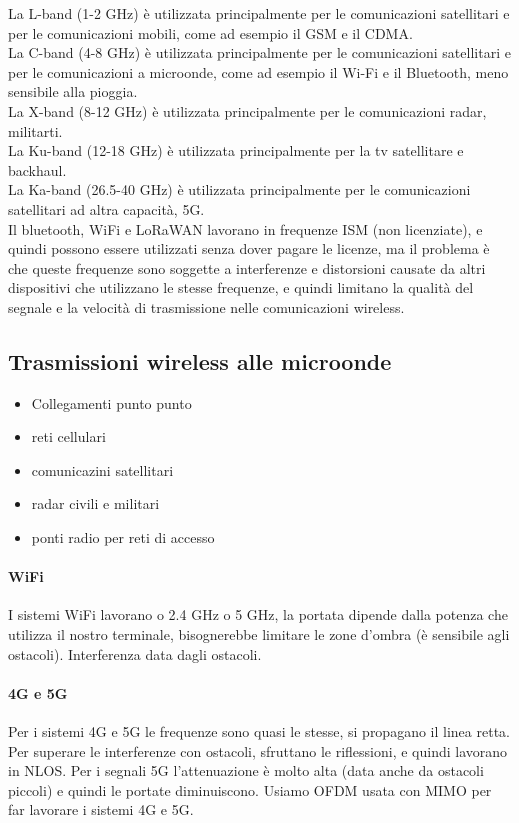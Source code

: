La L-band (1-2 GHz) è utilizzata principalmente per le comunicazioni satellitari e per le comunicazioni mobili, come ad esempio il GSM e il CDMA.\\
La C-band (4-8 GHz) è utilizzata principalmente per le comunicazioni satellitari e per le comunicazioni a microonde, come ad esempio il Wi-Fi e il Bluetooth, meno sensibile alla pioggia.\\
La X-band (8-12 GHz) è utilizzata principalmente per le comunicazioni radar, militarti.\\   
La Ku-band (12-18 GHz) è utilizzata principalmente per la tv satellitare e backhaul.\\
La Ka-band (26.5-40 GHz) è utilizzata principalmente per le comunicazioni satellitari ad altra capacità, 5G.\\

Il bluetooth, WiFi e LoRaWAN lavorano in frequenze ISM (non licenziate), e quindi possono essere utilizzati senza dover pagare le licenze, ma il problema è che queste frequenze sono soggette a interferenze e distorsioni causate da altri dispositivi che utilizzano le stesse frequenze, e quindi limitano la qualità del segnale e la velocità di trasmissione nelle comunicazioni wireless.\\

\subsection{Trasmissioni wireless alle microonde}

\begin{itemize}
    \item Collegamenti punto punto
    \item reti cellulari
    \item comunicazini satellitari
    \item radar civili e militari
    \item ponti radio per reti di accesso 
\end{itemize}

\paragraph{WiFi}I sistemi WiFi lavorano o 2.4 GHz o 5 GHz, la portata dipende dalla potenza che utilizza il nostro terminale, bisognerebbe limitare le zone d'ombra (è sensibile agli ostacoli). Interferenza data dagli ostacoli.\\

\paragraph{4G e 5G}Per i sistemi 4G e 5G le frequenze sono quasi le stesse, si propagano il linea retta. Per superare le interferenze con ostacoli, sfruttano le riflessioni, e quindi lavorano in NLOS. Per i segnali 5G l'attenuazione è molto alta (data anche da ostacoli piccoli) e quindi le portate diminuiscono.
Usiamo OFDM usata con MIMO per far lavorare i sistemi 4G e 5G.\\

